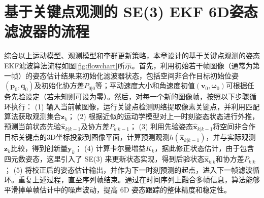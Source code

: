 \section{基于关键点观测的 SE(3) EKF 6D姿态滤波器的流程}

综合以上运动模型、观测模型和李群更新策略，本章设计的基于关键点观测的姿态EKF滤波算法流程如图\ref{fig:flowchart}所示。首先，利用初始若干帧图像（通常为第一帧）的姿态估计结果来初始化滤波器状态，包括空间非合作目标初始位姿$(\mathbf{p}_0, \mathbf{q}_0)$及初始化协方差$P_{0|0}$等；平动速度大小和角速度初值$(\mathbf{v}_0, \boldsymbol{\omega}_0)$可根据任务先验设定（若未知则可设为零）。然后，对每一个新的图像帧，按照以下步骤循环执行： (1) 输入当前帧图像，运行关键点检测网络提取像素关键点，并利用匹配算法获取观测集合$\mathbf{z}_k$； (2) 根据近似的运动学模型对上一时刻姿态状态进行外推，预测当前状态先验$\hat{\mathbf{x}}_{k|k-1}$及协方差$P_{k|k-1}$； (3) 利用先验姿态$\hat{\mathbf{x}}_{k|k-1}$将空间非合作目标关键点的3D坐标投影到图像平面，计算预测观测$h(\hat{\mathbf{x}}_{k|k-1})$，并与实际观测$\mathbf{z}_k$比较，得到创新量$\mathbf{y}_k$； (4) 计算卡尔曼增益$K_k$，据此修正状态估计，由于包含四元数姿态，这里引入了 SE(3) 来更新状态实现，得到后验状态$\hat{\mathbf{x}}_{k|k}$和协方差$P_{k|k}$； (5) 将校正后的姿态估计输出，并作为下一时刻预测的起点，进入下一帧滤波循环。重复上述过程，直至序列帧结束。通过在时间序列上融合多帧信息，算法能够平滑掉单帧估计中的噪声波动，提高 6D 姿态跟踪的整体精度和稳定性。

